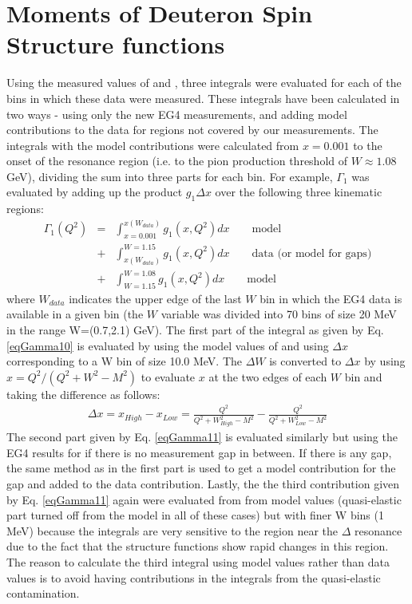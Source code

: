 \section{Moments of Deuteron Spin Structure functions}
Using the measured values of \gones and \afone, three integrals were evaluated for each of the \qsqs bins in which these data were measured. These integrals have been calculated in two ways - using only the new EG4 measurements, and adding model contributions to the data %
for regions not covered by our measurements. %
The integrals with the model contributions were calculated from $x=0.001$ to the onset of the resonance region (i.e. to the pion production threshold of $W\approx 1.08 $ GeV), dividing the sum into three parts for each \qsqs bin. For example, $\Gamma_1$ was evaluated by adding up the product $g_1 \Delta x$ over the following three kinematic regions:
\begin{eqnarray}
\label{eqGamma10}
\Gamma_1(Q^2) &=& \int^{x(W_{data})}_{x=0.001}  g_1(x,Q^2) dx \qquad \text{model} \\ %
\label{eqGamma11}
              &+& \int_{x(W_{data})}^{W=1.15}   g_1(x,Q^2) dx \qquad \text{data (or model for gaps)} \\%
\label{eqGamma12}
              &+& \int^{W=1.08}_{W=1.15}        g_1(x,Q^2) dx \qquad \text{model} %
\end{eqnarray}
where $W_{data}$ indicates the upper edge of the last $W$ bin in which the EG4 data is available in a given \qsqs bin (the $W$ variable was divided into 70 bins of size 20 MeV in the range W=(0.7,2.1) GeV). The first part of the integral as given by Eq. \ref{eqGamma10} is evaluated by using the model values of \gones and using $\Delta x$ corresponding to a W bin of size 10.0 MeV. The $\Delta W$ is converted to $\Delta x$ by using $x = Q^2/(Q^2 + W^2 - M^2)$ to evaluate $x$ at the two edges of each $W$ bin and taking the difference as follows:
\begin{eqnarray}
\label{eqDeltaX}
\Delta x = x_{High} - x_{Low} = \frac{Q^2}{Q^2 + W_{High}^2 - M^2} - \frac{Q^2}{Q^2 + W_{Low}^2 - M^2}
\end{eqnarray}
The second part given by Eq. \ref{eqGamma11} is evaluated similarly but using the EG4 results for \gones if there is no measurement gap in between. If there is any gap, the same method as in the first part is used to get a model contribution for the gap and added to the data contribution. Lastly, the the third contribution given by Eq. \ref{eqGamma11} again were evaluated from from model values (quasi-elastic part turned off from the model in all of these cases) but with finer W bins (1 MeV) because the integrals are very sensitive to the region near the $\Delta$ resonance due to the fact that the structure functions show rapid changes in this region. The reason to calculate the third integral using model values rather than data values is to avoid having contributions in the integrals from the quasi-elastic contamination.

